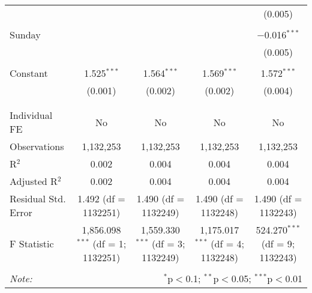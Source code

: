 \documentclass[
]{article}
\begin{document}
\begin{table}[!htbp]
{\begin{tabular}{@{\extracolsep{5pt}}lcccc}
  &  &  &  & (0.005) \\ 
  & & & & \\ 
 Sunday &  &  &  & $-$0.016$^{***}$ \\ 
  &  &  &  & (0.005) \\ 
  & & & & \\ 
 Constant & 1.525$^{***}$ & 1.564$^{***}$ & 1.569$^{***}$ & 1.572$^{***}$ \\ 
  & (0.001) & (0.002) & (0.002) & (0.004) \\ 
  & & & & \\ 
\hline \\[-1.8ex] 
Individual FE & No & No & No & No \\ 
Observations & 1,132,253 & 1,132,253 & 1,132,253 & 1,132,253 \\ 
R$^{2}$ & 0.002 & 0.004 & 0.004 & 0.004 \\ 
Adjusted R$^{2}$ & 0.002 & 0.004 & 0.004 & 0.004 \\ 
Residual Std. Error & 1.492 (df = 1132251) & 1.490 (df = 1132249) & 1.490 (df = 1132248) & 1.490 (df = 1132243) \\ 
F Statistic & 1,856.098$^{***}$ (df = 1; 1132251) & 1,559.330$^{***}$ (df = 3; 1132249) & 1,175.017$^{***}$ (df = 4; 1132248) & 524.270$^{***}$ (df = 9; 1132243) \\ 
\hline 
\hline \\[-1.8ex] 
\textit{Note:}  & \multicolumn{4}{r}{$^{*}$p$<$0.1; $^{**}$p$<$0.05; $^{***}$p$<$0.01} \\ 
\end{tabular}
} 
\end{table} 
\newpage
\end{document}
